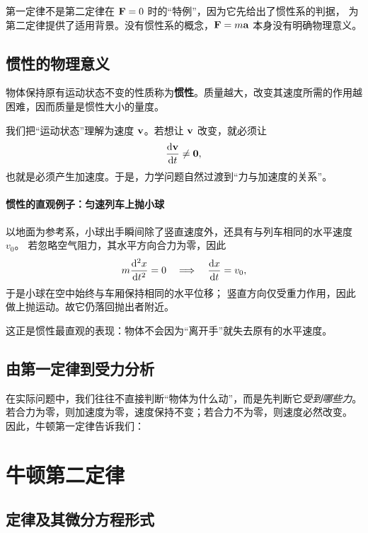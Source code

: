 \begin{remark}
第一定律不是第二定律在 $\vb{F}=0$ 时的“特例”，因为它先给出了惯性系的判据，
为第二定律提供了适用背景。没有惯性系的概念，$\vb{F}=m\vb{a}$ 本身没有明确物理意义。
\end{remark}

\subsection{惯性的物理意义}

\begin{definition}[惯性]
物体保持原有运动状态不变的性质称为\textbf{惯性}。质量越大，改变其速度所需的作用越困难，因而质量是惯性大小的量度。
\end{definition}

我们把“运动状态”理解为速度 $\vb{v}$。若想让 $\vb{v}$ 改变，就必须让
\[
  \dv{\vb{v}}{t}\neq \vb{0},
\]
也就是必须产生加速度。于是，力学问题自然过渡到“力与加速度的关系”。

\paragraph{惯性的直观例子：匀速列车上抛小球}
以地面为参考系，小球出手瞬间除了竖直速度外，还具有与列车相同的水平速度 $v_0$。
若忽略空气阻力，其水平方向合力为零，因此
\[
  m\dv[2]{x}{t}=0 \quad \Longrightarrow \quad \dv{x}{t}=v_0,
\]
于是小球在空中始终与车厢保持相同的水平位移；
竖直方向仅受重力作用，因此做上抛运动。故它仍落回抛出者附近。

这正是惯性最直观的表现：物体不会因为“离开手”就失去原有的水平速度。

\subsection{由第一定律到受力分析}

在实际问题中，我们往往不直接判断“物体为什么动”，而是先判断它\emph{受到哪些力}。
若合力为零，则加速度为零，速度保持不变；若合力不为零，则速度必然改变。
因此，牛顿第一定律告诉我们：

\begin{center}
\end{center}

\section{牛顿第二定律}
\subsection{定律及其微分方程形式}

